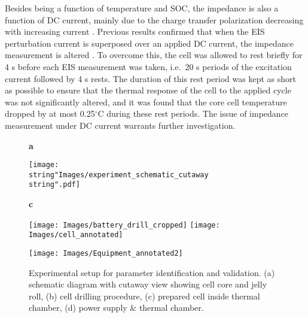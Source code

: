\documentclass[journal, english]{IEEEtran}
\begin{document}
Besides being a function of temperature and SOC, the impedance is
also a function of DC current, mainly due to the charge transfer polarization
decreasing with increasing current \cite{Ratnakumar2006}. Previous
results confirmed that when the EIS perturbation current is superposed
over an applied DC current, the impedance measurement is altered
\cite{Richardson2014}. To overcome this, the cell was allowed to
rest briefly for 4 s before each EIS measurement was taken, i.e.\ 20 s periods
of the excitation current followed by 4 s rests. The duration of this
rest period was kept as short as possible to ensure that the thermal
response of the cell to the applied cycle was not significantly altered,
and it was found that the core cell temperature dropped by at most
0.25$^{\circ}$C during these rest periods. The issue of impedance measurement
under DC current warrants further investigation.
\begin{figure}[h]
{\Large\textbf{ a}}\par
\begin{centering}
	\texttt{[image: \\string"Images/experiment\_schematic\_cutaway\\string".pdf]}
	\par\end{centering}\vspace{0.0cm}
\begin{centering}
{ \hspace{4cm} {\Large\textbf{c}} \par\vspace{0.1cm}}
\texttt{[image: Images/battery\_drill\_cropped]} \hspace{0.2cm}\texttt{[image: Images/cell\_annotated]} { \par\vspace{0.1cm}}
\par\end{centering}
\begin{centering}
\texttt{[image: Images/Equipment\_annotated2]}
\par\end{centering}
\caption{Experimental setup for parameter identification and validation. (a) schematic diagram with cutaway view showing cell core and jelly roll, (b) cell drilling procedure, (c) prepared cell inside thermal chamber, (d) power supply \& thermal chamber.} \label{fig:Experimental-setup}
\end{figure}
\end{document}
